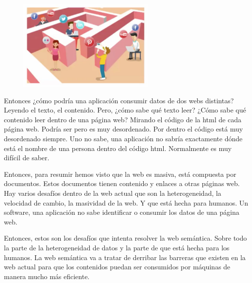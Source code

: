 \begin{enumerate}
	\begin{figure}[H]
		\centering
		\includegraphics[height=4.5cm]{imagenes/capitulo3/2} %
		\caption{}
		\label{}
	\end{figure}

\end{enumerate}


Entonces ¿cómo podría una aplicación consumir datos de dos webs distintas? Leyendo el texto, el contenido. Pero, ¿cómo sabe qué texto leer? ¿Cómo sabe qué contenido leer dentro de una página web? Mirando el código de la html de cada página web. Podría ser pero es muy desordenado. Por dentro el código está muy desordenado siempre. Uno no sabe, una aplicación no sabría exactamente dónde está el nombre de una persona dentro del código html. Normalmente es muy difícil de saber.

Entonces, para resumir hemos visto que la web es masiva, está compuesta por documentos. Estos documentos tienen contenido y enlaces a otras páginas web. Hay varios desafíos dentro de la web actual que son la heterogeneidad, la velocidad de cambio, la masividad de la web. Y que está hecha para humanos. Un software, una aplicación no sabe identificar o consumir los datos de una página web.

Entonces, estos son los desafíos que intenta resolver la web semántica. Sobre todo la parte de la heterogeneidad de datos y la parte de que está hecha para los humanos. La web semántica va a tratar de derribar las barreras que existen en la web actual para que los contenidos puedan ser consumidos por máquinas de manera mucho más eficiente.


